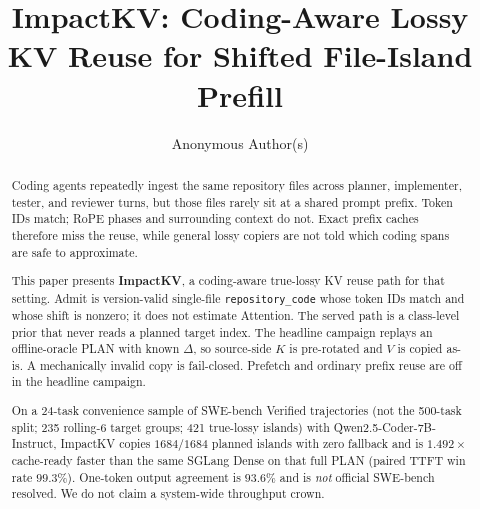 \documentclass[sigplan,anonymous,review,nonacm]{acmart}
\title{ImpactKV: Coding-Aware Lossy KV Reuse for Shifted File-Island Prefill}
\author{Anonymous Author(s)}
\affiliation{%
  \institution{Anonymous Institution}
  \country{}
}
\newcommand{\method}{ImpactKV}
\begin{document}
\begin{abstract}
Coding agents repeatedly ingest the same repository files across planner,
implementer, tester, and reviewer turns, but those files rarely sit at a
shared prompt prefix. Token IDs match; RoPE phases and surrounding context
do not. Exact prefix caches therefore miss the reuse, while general lossy
copiers are not told which coding spans are safe to approximate.

This paper presents \textbf{\method{}}, a coding-aware true-lossy KV reuse
path for that setting. Admit is version-valid single-file
\texttt{repository\_code} whose token IDs match and whose shift is
nonzero; it does not estimate Attention. The served path is a class-level
prior that never reads a planned target index. The headline campaign
replays an offline-oracle PLAN with known $\Delta$, so source-side $K$
is pre-rotated and $V$ is copied as-is. A mechanically invalid copy is
fail-closed. Prefetch and ordinary prefix reuse are off in the headline
campaign.

On a 24-task convenience sample of SWE-bench Verified trajectories
(not the 500-task split; 235 rolling-6 target groups; 421 true-lossy
islands) with Qwen2.5-Coder-7B-Instruct, \method{} copies $1684/1684$
planned islands with zero fallback and is $1.492\times$ cache-ready faster
than the same SGLang Dense on that full PLAN (paired TTFT win rate
$99.3\%$). One-token output
agreement is $93.6\%$ and is \emph{not} official SWE-bench resolved. We
do not claim a system-wide throughput crown.
\end{abstract}

\maketitle












\appendix




\end{document}
